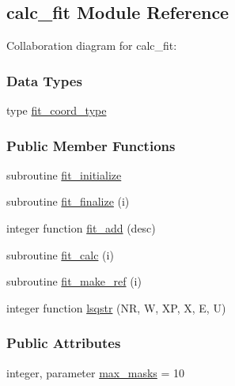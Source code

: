 \hypertarget{classcalc__fit}{\subsection{calc\-\_\-fit Module Reference}
\label{classcalc__fit}
}


Collaboration diagram for calc\-\_\-fit\-:
\subsubsection*{Data Types}
\begin{DoxyCompactItemize}
\item 
type \hyperlink{structcalc__fit_1_1fit__coord__type}{fit\-\_\-coord\-\_\-type}
\end{DoxyCompactItemize}
\subsubsection*{Public Member Functions}
\begin{DoxyCompactItemize}
\item 
subroutine \hyperlink{classcalc__fit_aa5c549c9ee1237fd1557b2067ce0f4b3}{fit\-\_\-initialize}
\item 
subroutine \hyperlink{classcalc__fit_ad14c1235965e5604af2221fe382c98dd}{fit\-\_\-finalize} (i)
\item 
integer function \hyperlink{classcalc__fit_a03132293af132901c3309c2095bc97a5}{fit\-\_\-add} (desc)
\item 
subroutine \hyperlink{classcalc__fit_a34e3efb2981d1e8ad36d1556e6f69e18}{fit\-\_\-calc} (i)
\item 
subroutine \hyperlink{classcalc__fit_a912b97a094e4dc8e23a38269dbd4f0dc}{fit\-\_\-make\-\_\-ref} (i)
\item 
integer function \hyperlink{classcalc__fit_aac8547f0c38c8a8b690d296238ffa70a}{lsqstr} (N\-R, W, X\-P, X, E, U)
\end{DoxyCompactItemize}
\subsubsection*{Public Attributes}
\begin{DoxyCompactItemize}
\item 
integer, parameter \hyperlink{classcalc__fit_a4b4ab2917d4cee62a409ee92aa6873d9}{max\-\_\-masks} = 10
\end{DoxyCompactItemize}
